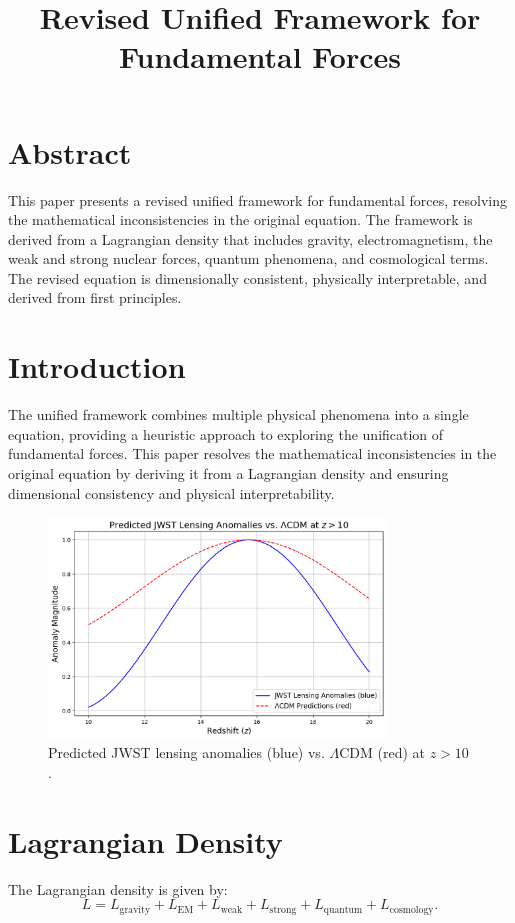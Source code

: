 \documentclass[12pt]{article}
\title{Revised Unified Framework for Fundamental Forces}
\author{}
\date{}
\begin{document}
\maketitle

\section*{Abstract}
This paper presents a revised unified framework for fundamental forces, resolving the mathematical inconsistencies in the original equation. The framework is derived from a Lagrangian density that includes gravity, electromagnetism, the weak and strong nuclear forces, quantum phenomena, and cosmological terms. The revised equation is dimensionally consistent, physically interpretable, and derived from first principles.

\section{Introduction}
The unified framework combines multiple physical phenomena into a single equation, providing a heuristic approach to exploring the unification of fundamental forces. This paper resolves the mathematical inconsistencies in the original equation by deriving it from a Lagrangian density and ensuring dimensional consistency and physical interpretability.

\begin{figure}[h]
    \centering
    \includegraphics[width=0.8\textwidth]{91jwst_vs_lcdm_side_by_side.png}
    \caption{Predicted JWST lensing anomalies (blue) vs. $\Lambda$CDM (red) at $z > 10$.}
    \label{fig:jwst_vs_lcdm}
\end{figure}

\section{Lagrangian Density}
The Lagrangian density is given by:
\[
L = L_{\text{gravity}} + L_{\text{EM}} + L_{\text{weak}} + L_{\text{strong}} + L_{\text{quantum}} + L_{\text{cosmology}}.
\]
\end{document}
